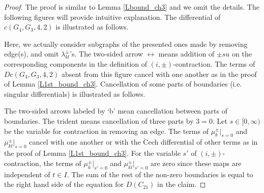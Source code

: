 \documentclass[reqno]{amsart}
\theoremstyle{definition}
\theoremstyle{plain}
\newcommand{\CECHC}{\check{\mathrm{C}}}
\begin{document}
\begin{proof}
The proof is similar to Lemma \ref{Lbound_ch3} and we omit the details. The following figures will provide  intuitive explanation. 
The differential  of $c(G_4,G_3,4,2)$ is illustrated as follows.
\begin{figure}[H]
\begin{center}
\vspace{4mm}
\end{center}
\caption{}\label{Fc(G4,G3,4,2)}\vspace{-0.7cm}
\end{figure}
Here,  we actually consider subgraphs of the presented ones made by removing  edge(s), and omit $\lambda_{kl}^\pm$'s.  The two-sided arrow $\leftrightarrow$ means addition of $\pm su$ on the corresponding components in the definition of $(i,\pm)$-contraction. The terms of $Dc(G_4,G_3,4,2)$ absent from this figure cancel with one another as in the proof of Lemma \ref{L1st_bound_ch3}.
Cancellation of some parts of boundaries (i.e. singular differentials) is illustrated as follows. 
\begin{figure}[H]
\begin{center}
\phantom{aaaaaa}\vspace{-3cm}
\end{center}
\caption{}\label{Fcancel}
\vspace{-0.5cm}
\end{figure}
 The two-sided arrows labeled by `b' mean cancellation between parts of boundaries. The trident means cancellation of three parts by $3=0$. Let $s\in [0,\infty)$ be the variable for contraction in removing an edge. The terms of $\mu_k^\pm|_{s=0}$ and $\mu_{kl}^\pm|_{s=0}$ cancel with one another or with the $\CECHC$ech differential of other terms as in the proof of Lemma \ref{L1st_bound_ch3}. For the variable $s'$ of $(i,\pm)$-contraction, the terms of $\mu_k^\pm|_{s'=0}$ and $\mu_{kl}^\pm|_{s'=0}$   are zero since these maps are independent of $t\in I$.  The sum of the rest of the non-zero boundaries is equal to the right hand side of the equation for $D(C_{21})$ in the claim.
\end{proof} 
\end{document}
